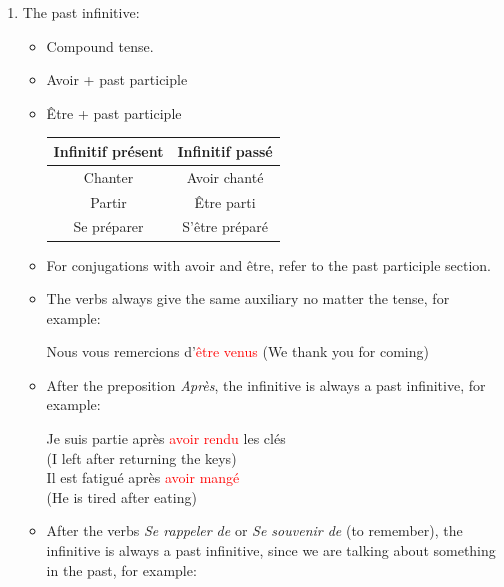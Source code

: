 \documentclass{book}
\begin{document}
\begin{enumerate}
\begin{itemize}
\begin{center}
            (We have to leave now) \\
            Il fault \textcolor{red}{aller} faire des courses \\
            (We have to go grocery shopping) 
        \end{center}
    \end{itemize}
    \item The past infinitive:
    \begin{itemize}
        \item Compound tense.
        \item Avoir + past participle
        \item Être + past participle
        \begin{center}
            \begin{tabular}{|c|c|}
                \hline
                \textbf{Infinitif présent} & \textbf{Infinitif passé} \\
                \hline
                Chanter & Avoir chanté \\
                Partir & Être parti \\
                Se préparer & S'être préparé \\
                \hline
            \end{tabular}
        \end{center}
        \item For conjugations with avoir and être, refer to the past participle section.
        \item The verbs always give the same auxiliary no matter the tense, for example:
            \begin{center}
                Nous vous remercions d'\textcolor{red}{être venus} (We thank you for coming) \\
            \end{center}
        \item After the preposition \textit{Après}, the infinitive is always a past infinitive, for example:
            \begin{center}
                Je suis partie après \textcolor{red}{avoir rendu} les clés \\
                (I left after returning the keys) \\
                Il est fatigué après \textcolor{red}{avoir mangé} \\
                (He is tired after eating)  
            \end{center}
        \item After the verbs \textit{Se rappeler de} or \textit{Se souvenir de} (to remember), the infinitive is always a past infinitive, since we are talking about something in the past, for example:

\end{itemize}
\end{enumerate}
\end{document}
